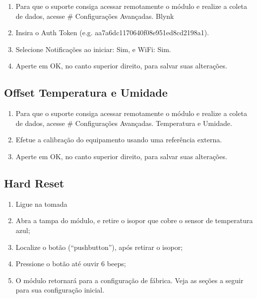 \begin{enumerate}
    \item
    Para que o suporte consiga acessar remotamente o módulo e realize a coleta de dados, acesse \# \textrightarrow{} Configurações Avançadas.\textrightarrow{} Blynk

    \item
    Insira o Auth Token (e.g. aa7a6dc1170640f08e951ed8cd2198a1).

    \item
    Selecione Notificações ao iniciar: Sim, e WiFi: Sim.

    \item
    Aperte em OK, no canto superior direito, para salvar suas alterações.
\end{enumerate}

\subsection{Offset Temperatura e Umidade}

\begin{enumerate}
    \item
    Para que o suporte consiga acessar remotamente o módulo e realize a coleta de dados, acesse \# \textrightarrow{} Configurações Avançadas.\textrightarrow{} Temperatura e Umidade.

    \item
    Efetue a calibração do equipamento usando uma referência externa.

    \item
    Aperte em OK, no canto superior direito, para salvar suas alterações.
\end{enumerate}

\subsection{Hard Reset}
\begin{enumerate}
	\item Ligue na tomada
	\item Abra a tampa do módulo, e retire o isopor que cobre o sensor de temperatura azul;
	\item Localize o botão (“pushbutton”), após retirar o isopor;
	\item Pressione o botão até ouvir 6 beeps;
	\item O módulo retornará para a configuração de fábrica. Veja as seções a seguir para sua configuração inicial.
\end{enumerate}

